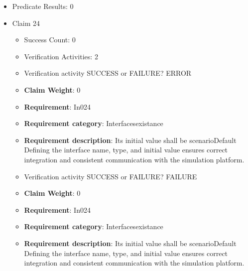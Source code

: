 \documentclass{article}
\begin{document}
\begin{itemize}
\begin{itemize}
					\item Verification activity SUCCESS or FAILURE? FAILURE
					\item \textbf{Claim Weight}: 0
						\item \textbf{Requirement}: In023 
						\item \textbf{Requirement category}: Interfacesexistance 
						\item \textbf{Requirement description}: Its initial value shall be set to 0 Defining the interface name, type, and initial value ensures correct integration and consistent communication with the simulation platform.
					
				\end{itemize}
				
									    
				\item Predicate Results: 0

  				  \item Claim 24
				\begin{itemize}
			    	\item Success Count: 0 
			    	\item Verification Activities: 2
					\item Verification activity SUCCESS or FAILURE? ERROR
					\item \textbf{Claim Weight}: 0
						\item \textbf{Requirement}: In024 
						\item \textbf{Requirement category}: Interfacesexistance 
						\item \textbf{Requirement description}: Its initial value shall be scenarioDefault Defining the interface name, type, and initial value ensures correct integration and consistent communication with the simulation platform.
					
					\item Verification activity SUCCESS or FAILURE? FAILURE
					\item \textbf{Claim Weight}: 0
						\item \textbf{Requirement}: In024 
						\item \textbf{Requirement category}: Interfacesexistance 
						\item \textbf{Requirement description}: Its initial value shall be scenarioDefault Defining the interface name, type, and initial value ensures correct integration and consistent communication with the simulation platform.
					
				\end{itemize}
				

\end{itemize}
\end{document}
